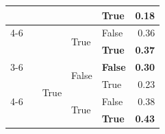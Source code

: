 \begin{tabular}{@{}lllllr@{}}
                                                &                                   &                           &                           & True                  & 0.18 \\
    \cmidrule{4-6}                                                                                                                                                     
                                                &                                   &                           & \multirow[c]{2}{*}{True}  & False                 & 0.36 \\
                                                &                                   &                           &                           & \textbf{True}         & \textbf{0.37} \\
    \cmidrule{3-6}                                                                                                                                                     
                                                &                                   & \multirow[c]{4}{*}{True}  & \multirow[c]{2}{*}{False} & \textbf{False}        & \textbf{0.30} \\
                                                &                                   &                           &                           & True                  & 0.23 \\
    \cmidrule{4-6}                                                                                                                                                     
                                                &                                   &                           & \multirow[c]{2}{*}{True}  & False                 & 0.38 \\
                                                &                                   &                           &                           & \textbf{True}         & \textbf{0.43} \\
   \bottomrule
\end{tabular}
